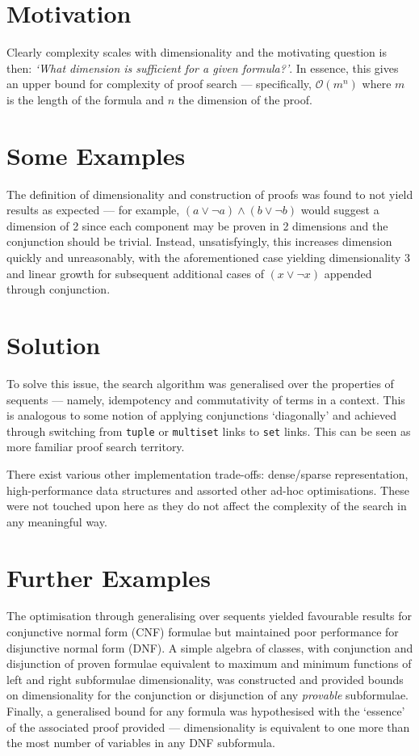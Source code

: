     \section*{Motivation}
        Clearly complexity scales with dimensionality and the motivating question is then: \textit{`What dimension is sufficient for a given formula?'}.
        In essence, this gives an upper bound for complexity of proof search --- specifically, $\mathcal{O}(m^n)$ where $m$ is the length of the formula and $n$ the dimension of the proof.

    \section*{Some Examples}
        The definition of dimensionality and construction of proofs was found to not yield results as expected --- for example, $(a \vee \neg a) \wedge (b \vee \neg b)$ would suggest a dimension of 2 since each component may be proven in 2 dimensions and the conjunction should be trivial.
        Instead, unsatisfyingly, this increases dimension quickly and unreasonably, with the aforementioned case yielding dimensionality 3 and linear growth for subsequent additional cases of $(x \vee \neg x)$ appended through conjunction.

    \section*{Solution}
        To solve this issue, the search algorithm was generalised over the properties of sequents --- namely, idempotency and commutativity of terms in a context.
        This is analogous to some notion of applying conjunctions `diagonally' and achieved through switching from \texttt{tuple} or \texttt{multiset} links to \texttt{set} links.
        This can be seen as more familiar proof search territory.
        
        There exist various other implementation trade-offs: dense/sparse representation, high-performance data structures and assorted other ad-hoc optimisations.
        These were not touched upon here as they do not affect the complexity of the search in any meaningful way.

    \section*{Further Examples}
        The optimisation through generalising over sequents yielded favourable results for conjunctive normal form (CNF) formulae but maintained poor performance for disjunctive normal form (DNF).
        A simple algebra of classes, with conjunction and disjunction of proven formulae equivalent to maximum and minimum functions of left and right subformulae dimensionality, was constructed and provided bounds on dimensionality for the conjunction or disjunction of any \textit{provable} subformulae.
        Finally, a generalised bound for any formula was hypothesised with the `essence' of the associated proof provided --- dimensionality is equivalent to one more than the most number of variables in any DNF subformula.

